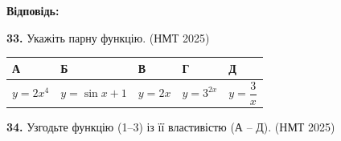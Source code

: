 \documentclass[14pt]{extarticle}
\newcommand{\answerTableTall}[5]{
\begin{center}
\begin{tabular}{|*{5}{>{\centering\arraybackslash}m{2.8cm}|}}
\hline
\rule[-0.3cm]{0pt}{0.8cm}\textbf{А} & \textbf{Б} & \textbf{В} & \textbf{Г} & \textbf{Д} \\
\hline
\rule[-0.9cm]{0pt}{2.0cm}#1 & 
\rule[-0.9cm]{0pt}{2.0cm}#2 & 
\rule[-0.9cm]{0pt}{2.0cm}#3 & 
\rule[-0.9cm]{0pt}{2.0cm}#4 & 
\rule[-0.9cm]{0pt}{2.0cm}#5 \\
\hline
\end{tabular}
\end{center}
}
\newcommand{\nmtyear}[1]{\hfill{\small\color{yearcolor}(НМТ #1)}}
\begin{document}
\vspace{0.3cm}
\noindent\textbf{Відповідь: \underline{\hspace{3cm}}} 

\vspace{0.7cm}

\noindent\textbf{33.} Укажіть парну функцію. \nmtyear{2025}

\vspace{0.3cm}
\answerTableTall{$y=2x^4$}{$y=\sin x + 1$}{$y=2x$}{$y=3^{2x}$}{$y=\dfrac{3}{x}$}

\vspace{0.7cm}

\noindent\textbf{34.} Узгодьте функцію (1–3) із її властивістю (А – Д). \nmtyear{2025}

\vspace{0.3cm}
\end{document}
